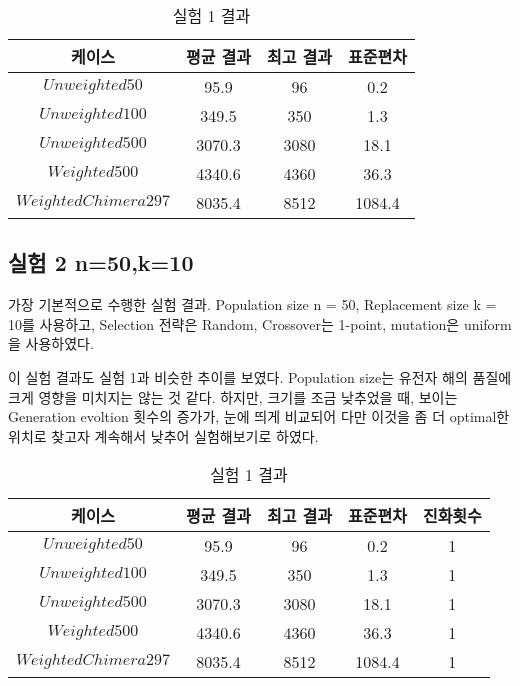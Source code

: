\documentclass{article}
\begin{document}
 \begin{table}[h]
 \begin{center}
\caption{실험 1 결과}
\begin{tabular}{cccc}
\hline\hline
케이스 & 평균 결과 & 최고 결과 & 표준편차\\
\hline\hline
$Unweighted 50$ & 95.9 & 96 & 0.2 \\
\hline
$Unweighted 100$ & 349.5 & 350 & 1.3\\
\hline
$Unweighted 500$ & 3070.3 & 3080 & 18.1\\
\hline
$Weighted 500$ & 4340.6 & 4360 & 36.3\\
\hline
$Weighted Chimera 297$ & 8035.4 & 8512 & 1084.4\\
\hline
\end{tabular}
\end{center}
\end{table}


\subsection{실험 2 n=50,k=10}

가장 기본적으로 수행한 실험 결과. Population size n = 50, Replacement size k = 10를 사용하고, Selection 전략은 Random, Crossover는 1-point, mutation은 uniform 을 사용하였다.

이 실험 결과도 실험 1과 비슷한 추이를 보였다. Population size는 유전자 해의 품질에 크게 영향을 미치지는 않는 것 같다. 하지만, 크기를 조금 낮추었을 때, 보이는 Generation evoltion 횟수의 증가가, 눈에 띄게 비교되어 다만 이것을 좀 더 optimal한 위치로 찾고자 계속해서 낮추어 실험해보기로 하였다.



 \begin{table}[h]
 \begin{center}
\caption{실험 1 결과}
\begin{tabular}{ccccc}
\hline\hline
케이스 & 평균 결과 & 최고 결과 & 표준편차 & 진화횟수\\
\hline\hline
$Unweighted 50$ & 95.9 & 96 & 0.2 & 1\\
\hline
$Unweighted 100$ & 349.5 & 350 & 1.3 & 1\\
\hline
$Unweighted 500$ & 3070.3 & 3080 & 18.1 & 1\\
\hline
$Weighted 500$ & 4340.6 & 4360 & 36.3 & 1\\
\hline
$Weighted Chimera 297$ & 8035.4 & 8512 & 1084.4 & 1\\
\hline
\end{tabular}
\end{center}
\end{table}
\end{document}
